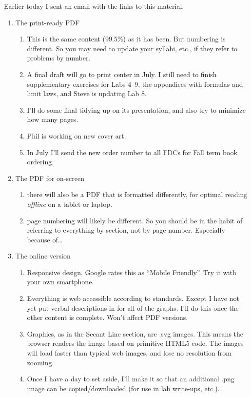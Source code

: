 \documentclass[12pt]{article}
\begin{document}
Earlier today I sent an email with the links to this material.

\begin{enumerate}
\item The print-ready PDF
\begin{enumerate}
\item This is the same content (99.5\%) as it has been. But numbering is different. So you may need to update your syllabi, etc., if they refer to problems by number.
\item A final draft will go to print center in July. I still need to finish supplementary exercises for Labs 4--9, the appendices with formulas and limit laws, and Steve is updating Lab 8.
\item I'll do some final tidying up on its presentation, and also try to minimize how many pages.
\item Phil is working on new cover art.
\item In July I'll send the new order number to all FDCs for Fall term book ordering.
\end{enumerate}
\item The PDF for on-screen
\begin{enumerate}
\item there will also be a PDF that is formatted differently, for optimal reading \emph{offline} on a tablet or laptop.
\item page numbering will likely be different. So you should be in the habit of referring to everything by section, not by page number. Especially because of\ldots
\end{enumerate}
\item The online version
\begin{enumerate}
\item Responsive design. Google rates this as ``Mobile Friendly''. Try it with your own smartphone.
\item Everything is web accessible according to standards. Except I have not yet put verbal descriptions in for all of the graphs. I'll do this once the other content is complete. Won't affect PDF versions.
\item Graphics, as in the Secant Line section, are .svg images. This means the browser renders the image based on primitive HTML5 code. The images will load faster than typical web images, and lose no resolution from zooming. 
\item Once I have a day to set aside, I'll make it so that an additional .png image can be copied/downloaded (for use in lab write-ups, etc.).

\end{enumerate}
\end{enumerate}
\end{document}

